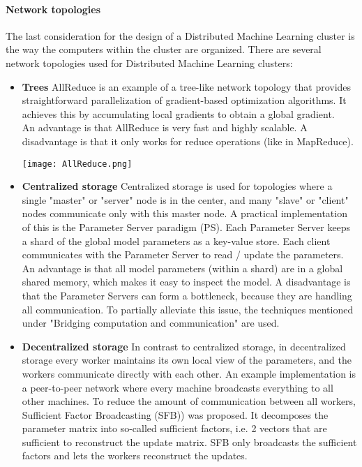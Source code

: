 \paragraph{Network topologies}
The last consideration for the design of a Distributed Machine Learning cluster is the way the computers within the cluster are organized. There are several network topologies used for Distributed Machine Learning clusters:
\begin{itemize}
	\item \textbf{Trees} AllReduce\cite{Agar14} is an example of a tree-like network topology that provides straightforward parallelization of gradient-based optimization algorithms. It achieves this by accumulating local gradients to obtain a global gradient.\\
	An advantage is that AllReduce is very fast and highly scalable. A disadvantage is that it only works for reduce operations (like in MapReduce).\\
	\begin{minipage}{\linewidth}
		\centering
		\texttt{[image: AllReduce.png]}
	\end{minipage}
	\item \textbf{Centralized storage} Centralized storage is used for topologies where a single "master" or "server" node is in the center, and many "slave" or "client" nodes communicate only with this master node. A practical implementation of this is the Parameter Server paradigm (PS). Each Parameter Server keeps a shard of the global model parameters as a key-value store. Each client communicates with the Parameter Server to read / update the parameters. \\
	An advantage is that all model parameters (within a shard) are in a global shared memory, which makes it easy to inspect the model. A disadvantage is that the Parameter Servers can form a bottleneck, because they are handling all communication. To partially alleviate this issue, the techniques mentioned under "Bridging computation and communication" are used.
	\item \textbf{Decentralized storage} In contrast to centralized storage, in decentralized storage every worker maintains its own local view of the parameters, and the workers communicate directly with each other. An example implementation is a peer-to-peer network where every machine broadcasts everything to all other machines. To reduce the amount of communication between all workers, Sufficient Factor Broadcasting (SFB)\cite{Li13}) was proposed. It decomposes the parameter matrix into so-called sufficient factors, i.e. 2 vectors that are sufficient to reconstruct the update matrix. SFB only broadcasts the sufficient factors and lets the workers reconstruct the updates.\\

\end{itemize}
